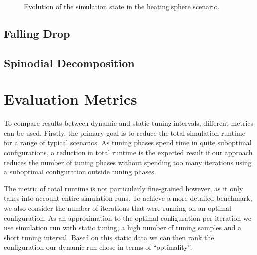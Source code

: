 \begin{figure}[htpb]
\begin{subfigure}[c]{.08\textwidth}
{
		}
	\end{subfigure}
	\label{fig:evolution_hs}
	\caption{Evolution of the simulation state in the heating sphere scenario.}
\end{figure}

\subsection{Falling Drop}
\label{subsec:fd}
\subsection{Spinodial Decomposition}
\label{subsec:sd}

\section{Evaluation Metrics}
\label{sec:metrics}
To compare results between dynamic and static tuning intervals, different metrics can be used.
Firstly, the primary goal is to reduce the total simulation runtime for a range of typical scenarios. As tuning phases spend time in quite suboptimal configurations, a reduction in total runtime is the expected result if our approach reduces the number of tuning phases without spending too many iterations using a suboptimal configuration outside tuning phases.

The metric of total runtime is not particularly fine-grained however, as it only takes into account entire simulation runs. To achieve a more detailed benchmark, we also consider the number of iterations that were running on an optimal configuration. As an approximation to the optimal configuration per iteration we use simulation run with static tuning, a high number of tuning samples and a short tuning interval. Based on this static data we can then rank the configuration our dynamic run chose in terms of \enquote{optimality}.


